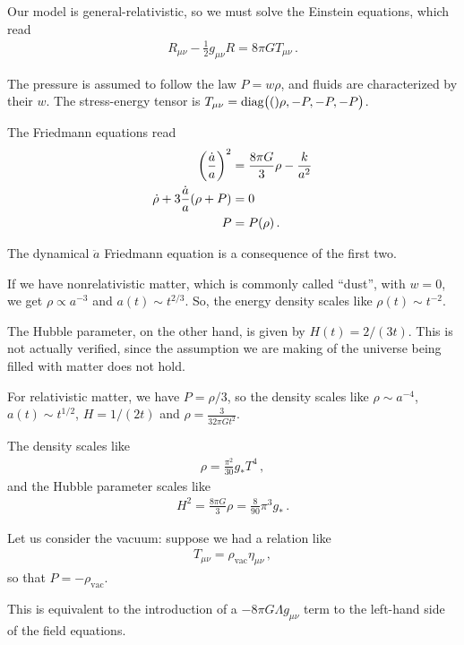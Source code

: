 \documentclass[main.tex]{subfiles}
\begin{document}
Our model is general-relativistic, so we must solve the Einstein equations, which read 
%
\begin{align}
R_{\mu \nu } - \frac{1}{2} g_{\mu \nu } R= 8 \pi G T_{\mu \nu }
\,.
\end{align}

The pressure is assumed to follow the law \(P = w \rho \), and fluids are characterized by their \(w\). 
The stress-energy tensor is \(T_{\mu \nu } = \text{diag}\qty(()\rho , - P, -P, -P)\).

The Friedmann equations read 
%
\begin{subequations}
\begin{align}
\qty( \frac{\dot{a}}{a})^2 &= \frac{8 \pi G}{3} \rho - \frac{k}{a^2}  \\
\dot{\rho} + 3 \frac{\dot{a}}{a}(\rho + P) &=0  \\
P &= P(\rho ) 
\,.
\end{align}
\end{subequations}

The dynamical \(\ddot{a}\) Friedmann equation is a consequence of the first two. 

If we have nonrelativistic matter, which is commonly called ``dust'', with \(w = 0\), we get \(\rho \propto a^{-3}\) and \(a(t) \sim t^{2/3}\).
So, the energy density scales like \(\rho (t) \sim t^{-2}\). 

The Hubble parameter, on the other hand, is given by \(H(t) = 2 / (3 t)\). This is not actually verified, since the assumption we are making of the universe being filled with matter does not hold. 

For relativistic matter, we have \(P = \rho /3\), so the density scales like \(\rho \sim a^{-4}\), \(a(t) \sim t^{1/2}\), \(H = 1/(2t)\) and \(\rho = \frac{3}{32 \pi G t^2} \).

The density scales like 
%
\begin{align}
\rho = \frac{\pi^2}{30} g_{*} T^{4}
\,,
\end{align}
%
and the Hubble parameter scales like 
%
\begin{align}
H^2 = \frac{8\pi G}{3} \rho = \frac{8}{90} \pi^3 g_{*}
\,.
\end{align}

Let us consider the vacuum: suppose we had a relation like 
%
\begin{align}
T_{\mu \nu } = \rho _{\text{vac}} \eta_{\mu \nu }
\,,
\end{align}
%
so that \(P = - \rho _{\text{vac}}\).

This is equivalent to the introduction of a \(- 8 \pi G \Lambda g_{\mu \nu }\) term to the left-hand side of the field equations. 
\end{document}
